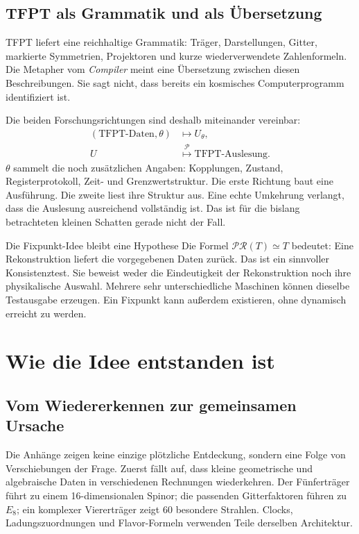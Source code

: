 \section{TFPT als Grammatik und als Übersetzung}


TFPT liefert eine reichhaltige Grammatik: Träger, Darstellungen, Gitter, markierte Symmetrien, Projektoren und kurze wiederverwendete Zahlenformeln. Die Metapher vom \emph{Compiler} meint eine Übersetzung zwischen diesen Beschreibungen. Sie sagt nicht, dass bereits ein kosmisches Computerprogramm identifiziert ist.

Die beiden Forschungsrichtungen sind deshalb miteinander vereinbar:
\begin{align}
(\text{TFPT-Daten},\theta)&\longmapsto U_{\theta},\label{eq:vorwaerts}\\
U&\overset{\mathcal P}{\longmapsto}\text{TFPT-Auslesung}.
\end{align}
$\theta$ sammelt die noch zusätzlichen Angaben: Kopplungen, Zustand, Registerprotokoll, Zeit- und Grenzwertstruktur. Die erste Richtung baut eine Ausführung. Die zweite liest ihre Struktur aus. Eine echte Umkehrung verlangt, dass die Auslesung ausreichend vollständig ist. Das ist für die bislang betrachteten kleinen Schatten gerade nicht der Fall.

\begin{grenze}{Die Fixpunkt-Idee bleibt eine Hypothese}
Die Formel $\mathcal P\mathcal R(T)\simeq T$ bedeutet: Eine Rekonstruktion liefert die vorgegebenen Daten zurück. Das ist ein sinnvoller Konsistenztest. Sie beweist weder die Eindeutigkeit der Rekonstruktion noch ihre physikalische Auswahl. Mehrere sehr unterschiedliche Maschinen können dieselbe Testausgabe erzeugen. Ein Fixpunkt kann außerdem existieren, ohne dynamisch erreicht zu werden.
\end{grenze}

\chapter{Wie die Idee entstanden ist}
\section{Vom Wiedererkennen zur gemeinsamen Ursache}
Die Anhänge zeigen keine einzige plötzliche Entdeckung, sondern eine Folge von Verschiebungen der Frage. Zuerst fällt auf, dass kleine geometrische und algebraische Daten in verschiedenen Rechnungen wiederkehren. Der Fünferträger führt zu einem 16-dimensionalen Spinor; die passenden Gitterfaktoren führen zu $E_8$; ein komplexer Viererträger zeigt 60 besondere Strahlen. Clocks, Ladungszuordnungen und Flavor-Formeln verwenden Teile derselben Architektur.

